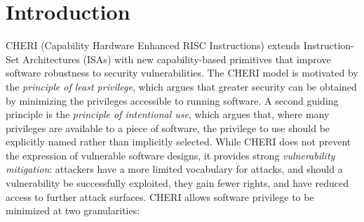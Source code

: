 \chapter{Introduction}
\label{chap:introduction}

CHERI (Capability Hardware Enhanced RISC Instructions) extends
Instruction-Set Architectures (ISAs) with new capability-based primitives that
improve software robustness to security vulnerabilities.
The CHERI model is motivated by the \textit{principle of least privilege},
which argues that greater security can be obtained by minimizing the
privileges accessible to running software.
A second guiding principle is the \textit{principle of intentional use}, which
argues that, where many privileges are available to a piece of software, the
privilege to use should be explicitly named rather than implicitly selected.
While CHERI does not prevent the expression of vulnerable software designs, it
provides strong \textit{vulnerability mitigation}: attackers have a more
limited vocabulary for attacks, and should a vulnerability be successfully
exploited, they gain fewer rights, and have reduced access to further attack
surfaces.
CHERI allows software privilege to be minimized at two granularities:

